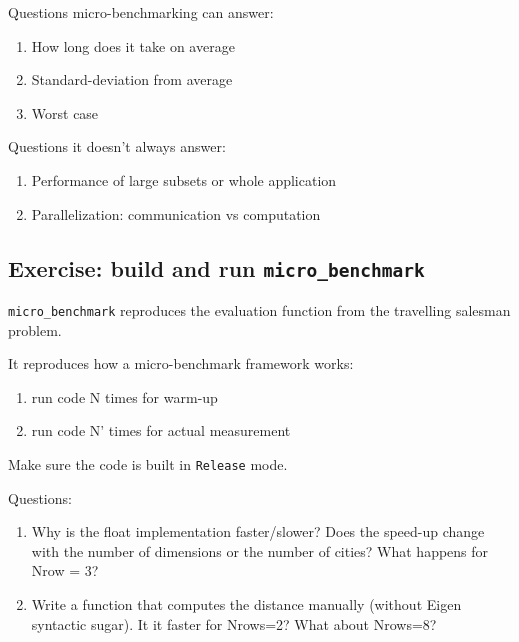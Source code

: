 Questions micro-benchmarking can answer:

\begin{enumerate}
\def\labelenumi{\arabic{enumi}.}
\itemsep1pt\parskip0pt
\item
  How long does it take on average
\item
  Standard-deviation from average
\item
  Worst case
\end{enumerate}

Questions it doesn't always answer:

\begin{enumerate}
\def\labelenumi{\arabic{enumi}.}
\itemsep1pt\parskip0pt
\item
  Performance of large subsets or whole application
\item
  Parallelization: communication vs computation
\end{enumerate}

\subsection{Exercise: build and run
\texttt{micro\_benchmark}}\label{exercise-build-and-run-microux5fbenchmark}

\texttt{micro\_benchmark} reproduces the evaluation function from the
travelling salesman problem.

It reproduces how a micro-benchmark framework works:

\begin{enumerate}
\def\labelenumi{\arabic{enumi}.}
\itemsep1pt\parskip0pt
\item
  run code N times for warm-up
\item
  run code N' times for actual measurement
\end{enumerate}

Make sure the code is built in \texttt{Release} mode.

Questions:

\begin{enumerate}
\def\labelenumi{\arabic{enumi}.}
\itemsep1pt\parskip0pt
\item
  Why is the float implementation faster/slower? Does the speed-up
  change with the number of dimensions or the number of cities? What
  happens for Nrow = 3?
\item
  Write a function that computes the distance manually (without Eigen
  syntactic sugar). It it faster for Nrows=2? What about Nrows=8?
\end{enumerate}


